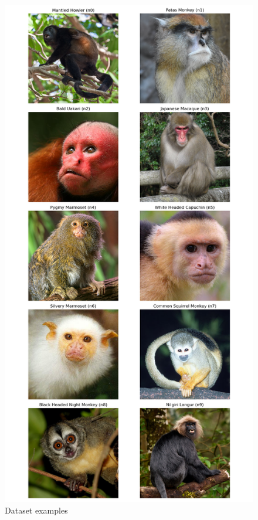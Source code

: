 \begin{figure}[h]
    \centering
    \includegraphics[height=1\textheight]{../plot/data_examples.png}
    \caption{Dataset examples}\label{fig:dataset_examples}
\end{figure}